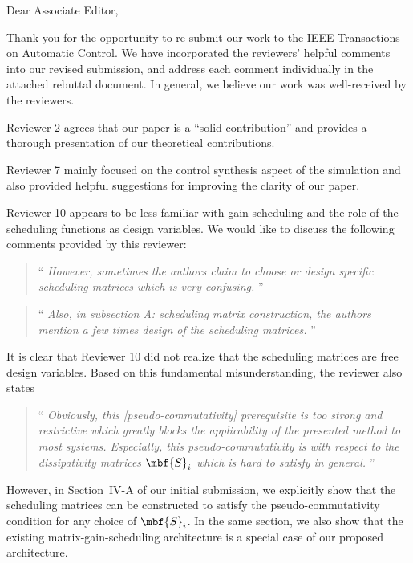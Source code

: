 \thispagestyle{empty}
\setcounter{page}{0}
\begin{flushleft}
    Dear Associate Editor,

    Thank you for the opportunity to re-submit our work to the IEEE Transactions on Automatic Control. We have incorporated the reviewers' helpful comments into our revised submission, and address each comment individually in the attached rebuttal document. In general, we believe our work was well-received by the reviewers. 
    
    Reviewer 2 agrees that our paper is a ``solid contribution'' and provides a thorough presentation of our theoretical contributions. 
    
    Reviewer 7 mainly focused on the control synthesis aspect of the simulation and also provided helpful suggestions for improving the clarity of our paper.
    
    Reviewer 10 appears to be less familiar with gain-scheduling and the role of the scheduling functions as design variables. We would like to discuss the following comments provided by this reviewer:
    \begin{quote}\enquote{\textit{%
        However, sometimes the authors claim to choose or design specific scheduling matrices which is very confusing.
        }}%
    \end{quote}
    \begin{quote}\enquote{\textit{%
        Also, in subsection A: scheduling matrix construction, the authors mention a few times design of the scheduling matrices.%
        }}%
    \end{quote}
    It is clear that Reviewer 10 did not realize that the scheduling matrices are free design variables. Based on this fundamental misunderstanding, the reviewer also states
    \begin{quote}\enquote{\textit{%
        Obviously, this [pseudo-commutativity] prerequisite is too strong and restrictive which greatly blocks the applicability of the presented method to most systems. Especially, this pseudo-commutativity is with respect to the dissipativity matrices \(\mbf{S}_i\) which is hard to satisfy in general.%
        }}%
    \end{quote}
    However, in Section~IV-A of our initial submission, we explicitly show that the scheduling matrices can be constructed to satisfy the pseudo-commutativity condition for any choice of \(\mbf{S}_i\). In the same section, we also show that the existing matrix-gain-scheduling architecture is a special case of our proposed architecture. 


\end{flushleft}
